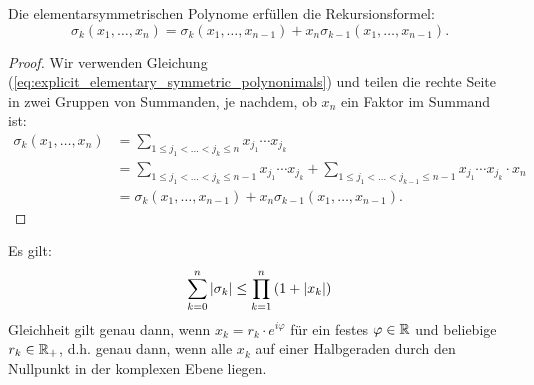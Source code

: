 \begin{lemma}
    \label{lemma:recursion_elementary_symmetric_polynomials}
    Die elementarsymmetrischen Polynome erfüllen die Rekursionsformel:
    \begin{equation}
        \label{eq:recursion_elementary_symmetric_polynomials}
        \sigma_k (x_1, \dots, x_{n}) = \sigma_k (x_1, \dots, x_{n-1}) + x_{n} \sigma_{k-1} (x_1, \dots, x_{n-1}).
    \end{equation}
\end{lemma}

\begin{proof}
    Wir verwenden Gleichung (\ref{eq:explicit_elementary_symmetric_polynonimals})
    und teilen die rechte Seite in zwei Gruppen von Summanden, je nachdem, ob
    $x_n$ ein Faktor im Summand ist:
    \begin{equation*}
        \begin{split}
            \sigma_k (x_1, \dots, x_{n})
            &= \sum_{1 \leq j_1 < \dots < j_k \leq n} x_{j_1} \cdots x_{j_k}\\
            &= \sum_{1 \leq j_1 < \dots < j_k \leq n-1} x_{j_1} \cdots x_{j_k}
            + \sum_{1 \leq j_1 < \dots < j_{k-1} \leq n-1} x_{j_1} \cdots x_{j_k} \cdot x_{n}\\
            &= \sigma_k (x_1, \dots, x_{n-1}) + x_{n} \sigma_{k-1} (x_1, \dots, x_{n-1}).
        \end{split}
    \end{equation*}
\end{proof}

\begin{lemma}
    \label{lemma:elementary_symmetric_polynomials_inequality}
    Es gilt:
    \begin{equation}
        \label{eq:elementary_symmetric_polynomials_inequality}
        \sum_{k=0}^{n} \left\lvert \sigma_{k} \right\rvert \leq \prod_{k=1}^{n} \left( 1 + \left\lvert x_k \right\rvert \right)
    \end{equation}
    Gleichheit gilt genau dann, wenn $x_k = r_k \cdot e^{i\varphi}$ für ein
    festes $\varphi \in \mathbb{R}$ und beliebige $r_k \in \mathbb{R}_+$,
    d.h. genau dann, wenn alle $x_k$ auf einer Halbgeraden durch den Nullpunkt
    in der komplexen Ebene liegen.
\end{lemma}

